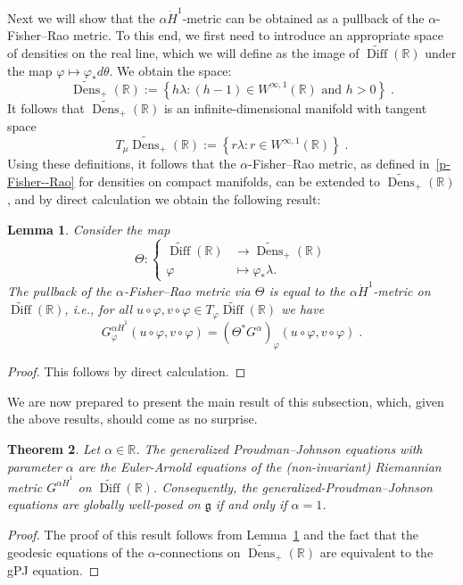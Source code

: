 \documentclass[11pt,reqno]{amsart}
\newtheorem{theorem}{Theorem}[section]
\newtheorem{lemma}[theorem]{Lemma}
\theoremstyle{definition}
\newcommand{\R}{\mathbb R}
\newcommand{\dx}{\lambda}
\newcommand{\DiffRshift}{\widetilde{\operatorname{Diff}}(\mathbb R)}
\newcommand{\DiffRLie}{\mathfrak g}
\newcommand{\DensR}{\widetilde{\operatorname{Dens}}_{+}(\R)}
\begin{document}
Next we will show that the $\alpha\dot H^1$-metric can be obtained as a pullback of the $\alpha$-Fisher--Rao metric. 
To this end, we first need to introduce an appropriate space of densities on the real line, which we will define as the image of $\DiffRshift$ under the map $\varphi \mapsto \varphi_*d\theta$. We obtain the space:
\begin{equation*}
\DensR:=\left\{h\dx: (h-1)\in W^{\infty,1}(\mathbb R)\text{ and } h>0\right\}\;.
\end{equation*}
It follows that $\DensR$ is an infinite-dimensional manifold with tangent space
\begin{equation*}
T_{\mu}\DensR:=\left\{r\dx: r\in W^{\infty,1}(\mathbb R)\right\}\;.
\end{equation*}
Using these definitions, it follows that the $\alpha$-Fisher--Rao metric, as defined in~\eqref{p-Fisher--Rao} for densities on compact manifolds, can be extended to $\DensR$, and by direct calculation we obtain the following result:
\begin{lemma}\label{lem:pullback}
Consider the map 
\begin{equation*}
\Theta: \begin{cases}
\DiffRshift&\to\DensR\\
\varphi&\mapsto \varphi_*\dx.
\end{cases}
\end{equation*}
The pullback of the $\alpha$-Fisher--Rao metric via $\Theta$ is equal to the $\alpha\dot H^1$-metric on $\DiffRshift$, i.e., for all $u\circ\varphi,v\circ\varphi\in T_{\varphi}\DiffRshift$ we have
\begin{equation*}
G^{\alpha\dot H^1}_{\varphi}(u\circ\varphi,v\circ\varphi)=(\Theta^*G^{\alpha})_{\varphi}(u\circ\varphi,v\circ\varphi)\;.
\end{equation*}
\end{lemma}
\begin{proof}
This follows by direct calculation.
\end{proof}
We are now prepared to present the main result of this subsection, which, given the above results, should come as no surprise.
\begin{theorem}
Let $\alpha\in \mathbb R$. The generalized Proudman--Johnson equations with parameter $\alpha$ are the Euler-Arnold equations of the (non-invariant) Riemannian metric $G^{\alpha\dot H^1}$ on $\DiffRshift$. Consequently, the generalized-Proudman--Johnson equations are globally well-posed on $\DiffRLie$ if and only if $\alpha=1$. 
\end{theorem}
\begin{proof}
The proof of this result follows from Lemma~\ref{lem:pullback} and the fact that the geodesic equations of the $\alpha$-connections on $\DensR$ are equivalent to the gPJ equation. 
\end{proof}
\end{document}
